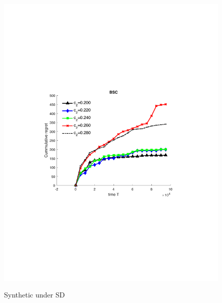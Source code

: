 \begin{figure}[!bt]
	\begin{minipage}{4.2cm}
		\centering
		\includegraphics[scale=0.3]{../Simulations/Figures/BSC_SD}
		\label{fig:BSC_SD}
		\vspace{-.3cm}
		\caption{\small Synthetic under SD}
	\end{minipage}
	\begin{minipage}{4.3cm}
		\centering

\end{minipage}
\end{figure}
